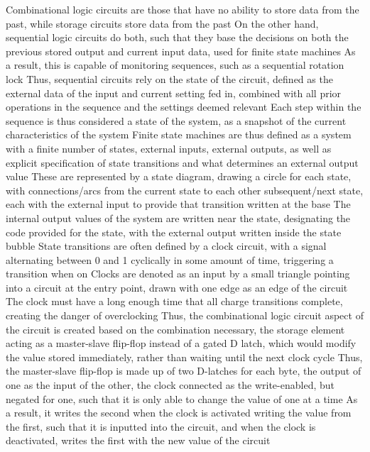 \documentclass[11 pt, twoside]{article}
\newenvironment{outline*}
{
	\begin{outline}[enumerate]
	}
	{\end{outline}
}
\begin{document}
\begin{outline*}
\1 Combinational logic circuits are those that have no ability to store data from the past, while storage circuits store data from the past
\2 On the other hand, sequential logic circuits do both, such that they base the decisions on both the previous stored output and current input data, used for finite state machines 
\2 As a result, this is capable of monitoring sequences, such as a sequential rotation lock
\1 Thus, sequential circuits rely on the state of the circuit, defined as the external data of the input and current setting fed in, combined with all prior operations in the sequence and the settings deemed relevant 
\2 Each step within the sequence is thus considered a state of the system, as a snapshot of the current characteristics of the system
\2 Finite state machines are thus defined as a system with a finite number of states, external inputs, external outputs, as well as explicit specification of state transitions and what determines an external output value
\3 These are represented by a state diagram, drawing a circle for each state, with connections/arcs from the current state to each other subsequent/next state, each with the external input to provide that transition written at the base
\3 The internal output values of the system are written near the state, designating the code provided for the state, with the external output written inside the state bubble
\1 State transitions are often defined by a clock circuit, with a signal alternating between 0 and 1 cyclically in some amount of time, triggering a transition when on
\2 Clocks are denoted as an input by a small triangle pointing into a circuit at the entry point, drawn with one edge as an edge of the circuit
\2 The clock must have a long enough time that all charge transitions complete, creating the danger of overclocking
\1 Thus, the combinational logic circuit aspect of the circuit is created based on the combination necessary, the storage element acting as a master-slave flip-flop instead of a gated D latch, which would modify the value stored immediately, rather than waiting until the next clock cycle
\2 Thus, the master-slave flip-flop is made up of two D-latches for each byte, the output of one as the input of the other, the clock connected as the write-enabled, but negated for one, such that it is only able to change the value of one at a time
\2 As a result, it writes the second when the clock is activated writing the value from the first, such that it is inputted into the circuit, and when the clock is deactivated, writes the first with the new value of the circuit

\end{outline*}
\end{document}
